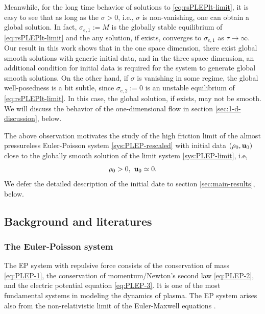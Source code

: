\documentclass[11pt]{article}
\theoremstyle{plain}
\theoremstyle{definition}
\theoremstyle{remark}
\renewcommand{\vec}[1]{{\bf #1}}
\numberwithin{equation}{section}
\begin{document}
    Meanwhile, for the long time behavior of solutions to \eqref{eq:rsPLEPlt-limit}, it is easy to see that as long as the $ \sigma > 0 $, i.e., $ \sigma $ is non-vanishing, one can obtain a global solution. 
    In fact, $ \sigma_{e,1} := M $ is the globally stable equilibrium of \eqref{eq:rsPLEPlt-limit} and the any solution, if exists, converges to $ \sigma_{e,1} $ as $ \tau \to \infty $. Our result in this work shows that in the one space dimension, there exist global smooth solutions with generic initial data, and in the three space dimension, an additional condition for initial data is required for the system to generate global smooth solutions. On the other hand, if $ \sigma $ is vanishing in some regime, the global well-posedness is a bit subtle, since $ \sigma_{e,2} :=0 $ is an unstable equilibrium of \eqref{eq:rsPLEPlt-limit}. In this case, the global solution, if exists, may not be smooth. We will discuss the behavior of the one-dimensional flow in section \ref{sec:1-d-discussion}, below. 

    The above observation motivates the study of the high friction limit of the almost pressureless Euler-Poisson system \eqref{sys:PLEP-rescaled} with initial data $ (\rho_0, \vec u_0) $ close to the globally smooth solution of the limit system \eqref{sys:PLEP-limit}, i.e, 
    \begin{equation}
        \label{eq:initial-data}
            \rho_0 > 0, \ \vec u_0 \simeq 0.
    \end{equation}
    We defer the detailed description of the initial date to section \ref{sec:main-results}, below.
    
    \subsection{Background and literatures} 
    \label{sec:background}

    \subsubsection*{The Euler-Poisson system}

    The EP system with repulsive force consists of the conservation of mass \eqref{eq:PLEP-1}, the conservation of momentum/Newton's second law \eqref{eq:PLEP-2}, and the electric potential equation \eqref{eq:PLEP-3}. It is one of the most fundamental systems in modeling the dynamics of plasma. The EP system arises also from the non-relativistic limit of the Euler-Maxwell equations \cite{pengConvergenceCompressibleEulerMaxwell2007,yangNonrelativisticLimitEuler2010,manfrediNonrelativisticLimitsMaxwells2013}.
\end{document}
